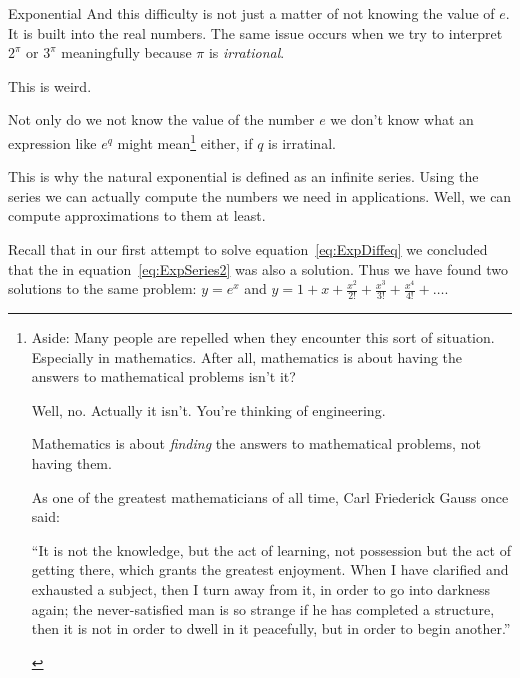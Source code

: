 \begin{mynotation}{Exponential}
  And this difficulty is not just a matter of not knowing the value of
  $e$.  It is built into the real numbers. The same issue occurs when
  we try to interpret $2^\pi$ or $3^\pi$ meaningfully because $\pi$ is
  \emph{irrational}.

  This is weird.

  Not only do we not know the value of the number $e$ we don't
   know what an expression like $e^q$ might mean\footnote{Aside: Many
    people are repelled when they encounter this sort of
    situation. Especially in mathematics. After all, mathematics is
    about having the answers to mathematical problems isn't it?

  Well, no. Actually it isn't. You're thinking of engineering.

  Mathematics is about \emph{finding} the answers to mathematical
  problems, not having them.

  As one of the greatest mathematicians
  of all time, Carl Friederick Gauss once said:\\
  \begin{center}
    \begin{minipage}[c]{0.85\linewidth}
      ``It is not the knowledge, but the act of learning, not
      possession but the act of getting there, which grants the
      greatest enjoyment. When I have clarified and exhausted a
      subject, then I turn away from it, in order to go into
      darkness again; the never-satisfied man is so strange if he
      has completed a structure, then it is not in order to dwell in
      it peacefully, but in order to begin another.''
    \end{minipage}
  \end{center}
} either, if $q$ is irratinal.

This is why the natural exponential is defined as an infinite
series. Using the series we can actually compute the numbers we need
in applications. Well, we can compute approximations to them at least.

Recall that in our first attempt to solve
equation~\ref{eq:ExpDiffeq} we concluded that the  in equation~\ref{eq:ExpSeries2} was also a solution. Thus we
have found two solutions to the same problem: $y=e^x$ and
$y=1+x+\frac{x^2}{2!}+\frac{x^3}{3!}+\frac{x^4}{4!}+\ldots.$


\end{mynotation}

